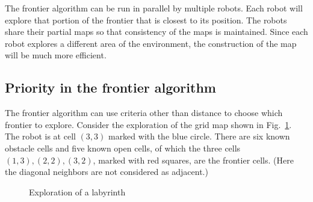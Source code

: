 The frontier algorithm can be run in parallel by multiple robots. Each robot will explore that portion of the frontier that is closest to its position. The robots share their partial maps so that consistency of the maps is maintained. Since each robot explores a different area of the environment, the construction of the map will be much more efficient.

\subsection{Priority in the frontier algorithm}\label{s.priority}

The frontier algorithm can use criteria other than distance to choose which frontier to explore. Consider the exploration of the grid map shown in Fig.~\ref{fig.map-seven}. The robot is at cell $(3,3)$ marked with the blue circle. There are six known obstacle cells and five known open cells, of which the three cells $(1,3), (2,2), (3,2)$, marked with red squares, are the frontier cells. (Here the diagonal neighbors are not considered as adjacent.)

\begin{figure}
\begin{center}
\caption{Exploration of a labyrinth}\label{fig.map-seven}
\end{center}
\end{figure}

